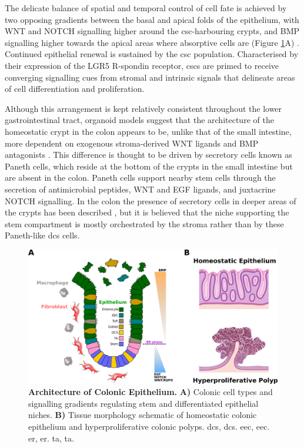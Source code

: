 The delicate balance of spatial and temporal control of cell fate is achieved by two opposing gradients between the basal and apical folds of the epithelium, with WNT and NOTCH signalling higher around the \acrshort{csc}-harbouring crypts, and BMP signalling higher towards the apical areas where absorptive cells are (Figure \ref{fig:1epi}A) \cite{bonis_intestinal_2021, beumer_cell_2021}. Continued epithelial renewal is sustained by the \acrshort{csc} population. Characterised by their expression of the LGR5 R-spondin receptor, \acrshort{csc}s are primed to receive converging signalling cues from stromal and intrinsic signals that delineate areas of cell differentiation and proliferation. 

Although this arrangement is kept relatively consistent throughout the lower gastrointestinal tract, organoid models suggest that the architecture of the homeostatic crypt in the colon appears to be, unlike that of the small intestine, more dependent on exogenous stroma-derived WNT ligands and BMP antagonists \cite{sato_long-term_2011, kondo_emerging_2019}. This difference is thought to be driven by secretory cells known as Paneth cells, which reside at the bottom of the crypts in the small intestine but are absent in the colon. Paneth cells support nearby stem cells through the secretion of antimicrobial peptides, WNT and EGF ligands, and juxtacrine NOTCH signalling. In the colon the presence of secretory cells in deeper areas of the crypts has been described \cite{sasaki_reg4_2016}, but it is believed that the niche supporting the stem compartment is mostly orchestrated by the stroma rather than by these Paneth-like \acrfull{dcs} cells.

\begin{figure}[H]
    \centering
    \includegraphics{01intro/figs/1BIO_gutepithelia.png}
    \caption{\textbf{Architecture of Colonic Epithelium.} \textbf{A)} Colonic cell types and signalling gradients regulating stem and differentiated epithelial niches. \textbf{B)} Tissue morphology schematic of homeostatic colonic epithelium and hyperproliferative colonic polyps. \acrshort{dcs}, \acrlong{dcs}. \acrshort{eec}, \acrlong{eec}. \acrshort{er}, \acrlong{er}. \acrshort{ta}, \acrlong{ta}.}
    \label{fig:1epi}
\end{figure}

